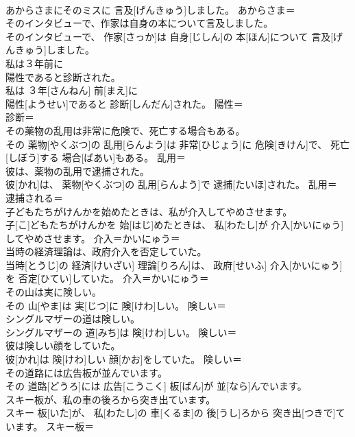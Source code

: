 \documentclass[8pt]{extreport}
\begin{document}
\begin{CJK}{UTF8}{min}
\\	あからさまにそのミスに 言及[げんきゅう]しました。	あからさま＝ 
\\	そのインタビューで、作家は自身の本について言及しました。	
\\	そのインタビューで、 作家[さっか]は 自身[じしん]の 本[ほん]について 言及[げんきゅう]しました。	
\\	私は３年前に
\\	陽性であると診断された。	
\\	私は ３年[さんねん] 前[まえ]に 
\\	陽性[ようせい]であると 診断[しんだん]された。	陽性＝ 
\\	診断＝ 
\\	その薬物の乱用は非常に危険で、死亡する場合もある。	
\\	その 薬物[やくぶつ]の 乱用[らんよう]は 非常[ひじょう]に 危険[きけん]で、 死亡[しぼう]する 場合[ばあい]もある。	乱用＝ 
\\	彼は、薬物の乱用で逮捕された。	
\\	彼[かれ]は、 薬物[やくぶつ]の 乱用[らんよう]で 逮捕[たいほ]された。	乱用＝ 
\\	逮捕される＝ 
\\	子どもたちがけんかを始めたときは、私が介入してやめさせます。	
\\	子[こ]どもたちがけんかを 始[はじ]めたときは、 私[わたし]が 介入[かいにゅう]してやめさせます。	介入＝かいにゅう＝ 
\\	当時の経済理論は、政府介入を否定していた。	
\\	当時[とうじ]の 経済[けいざい] 理論[りろん]は、 政府[せいふ] 介入[かいにゅう]を 否定[ひてい]していた。	介入＝かいにゅう＝ 
\\	その山は実に険しい。	
\\	その 山[やま]は 実[じつ]に 険[けわ]しい。	険しい＝ 
\\	シングルマザーの道は険しい。	
\\	シングルマザーの 道[みち]は 険[けわ]しい。	険しい＝ 
\\	彼は険しい顔をしていた。	
\\	彼[かれ]は 険[けわ]しい 顔[かお]をしていた。	険しい＝ 
\\	その道路には広告板が並んでいます。	
\\	その 道路[どうろ]には 広告[こうこく] 板[ばん]が 並[なら]んでいます。	
\\	スキー板が、私の車の後ろから突き出ています。	
\\	スキー 板[いた]が、 私[わたし]の 車[くるま]の 後[うし]ろから 突き出[つきで]ています。	スキー板＝ 

\end{CJK}
\end{document}
